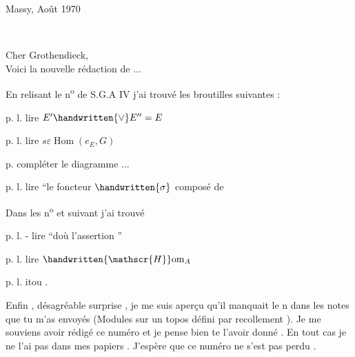 \begin{flushright}
Massy, Août 1970\\
\end{flushright}

\begin{flushright}
\\
\end{flushright}
Cher Grothendieck,\\

Voici la nouvelle rédaction de ...

En relisant le n\textsuperscript{o}  de S.G.A  IV j'ai trouvé les broutilles suivantes :

p.  l.  lire \(E'\handwritten{\vee} E'' = E\)

p.  l.  lire \(s\varepsilon\operatorname{Hom}(e_E,G)\)

p.  compléter le diagramme ...

p.  l.  lire ``le foncteur \(\handwritten{\sigma}\) composé de

Dans les n\textsuperscript{o}  et suivant j'ai trouvé

p.  l. - lire ``doù l'assertion ''

p.  l.  lire \(\handwritten{\mathscr{H}}\mathrm{om}_A\)

p. l.  itou .

\reversemarginpar
{}
\normalmarginpar
Enfin , désagréable surprise , je me suis aperçu qu'il manquait le n  dans les notes que tu m'as envoyés (Modules sur un topos défini par recollement ). Je me souviens avoir rédigé ce numéro et je pense bien te l'avoir donné . En tout cas je ne l'ai pas dans mes papiers . J'espère que ce numéro ne s'est pas perdu .

